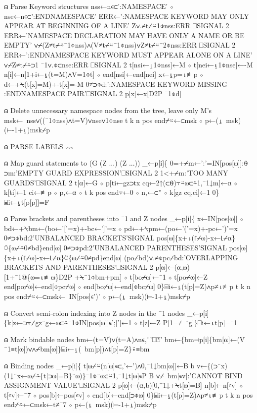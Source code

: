 \documentclass{article}%
\begin{document}
⍝ Parse Keyword structures
         nss←n∊⊂':NAMESPACE' ⋄ nse←n∊⊂':ENDNAMESPACE'
         ERR←':NAMESPACE KEYWORD MAY ONLY APPEAR AT BEGINNING OF A LINE'
         Z∨.≠t⌿⍨1⌽nss:ERR ⎕SIGNAL 2
         ERR←'NAMESPACE DECLARATION MAY HAVE ONLY A NAME OR BE EMPTY'
         ∨⌿(Z≠t⌿⍨¯1⌽nss)∧(V≠t⌿⍨¯1⌽nss)∨Z≠t⌿⍨¯2⌽nss:ERR ⎕SIGNAL 2
         ERR←':ENDNAMESPACE KEYWORD MUST APPEAR ALONE ON A LINE'
         ∨⌿Z≠t⌿⍨⊃1 ¯1∨.⌽⊂nse:ERR ⎕SIGNAL 2
         t[nsi←⍸1⌽nss]←M ⋄ t[nei←⍸1⌽nse]←-M
         n[i]←n[1+i←⍸(t=M)∧V=1⌽t] ⋄ end[nsi]←end[nei]
         x←⍸p=⍳≢p ⋄ d←+⍀(t[x]=M)+-t[x]=-M
         0≠⊃⌽d:':NAMESPACE KEYWORD MISSING :ENDNAMESPACE PAIR'⎕SIGNAL 2
         p[x]←x[D2P ¯1⌽d]

⍝ Delete unnecessary namespace nodes from the tree, leave only M's
         msk←~nss∨((¯1⌽nss)∧t=V)∨nse∨1⌽nse
         t k n pos end⌿⍨←⊂msk ⋄ p←(⍸~msk)(⊢-1+⍸)msk⌿p

⍝ PARSE LABELS ∘∘∘

⍝ Map guard statements to (G (Z ...) (Z ...))
         _←p[i]\{
                 0=+⌿m←':'=IN[pos[⍵]]:⍬
                 ⊃m:'EMPTY GUARD  EXPRESSION'⎕SIGNAL 2
                 1<+⌿m:'TOO MANY GUARDS'⎕SIGNAL 2
                 t[⍺]←G ⋄ p[ti←gz⊃tx cq←2↑(⊂⍬)⍪⍨⍵⊂⍨1,¯1↓m]←⍺ ⋄ k[ti]←1
                 ci←≢p ⋄ p,←⍺ ⋄ t k pos end⍪←0 ⋄ n,←⊂'' ⋄ k[gz cq,ci]←1
         0\}⌸i←⍸t[p[p]]=F

⍝ Parse brackets and parentheses into ¯1 and Z nodes
         _←p[i]\{
                 x←IN[pos[⍵]] ⋄ bd←+⍀bm←(bo←'['=x)+-bc←']'=x ⋄ pd←+⍀pm←(po←'('=x)+-pc←')'=x
                 0≠⊃⌽bd:2'UNBALANCED BRACKETS'SIGNAL pos[⍵]\{x+⍳(⌈⌿⍵)-x←⌊⌿⍺\}⍥\{⍵⌿⍨0≠bd\}end[⍵]
                 0≠⊃⌽pd:2'UNBALANCED PARENTHESES'SIGNAL pos[⍵]\{x+⍳(⌈⌿⍵)-x←⌊⌿⍺\}⍥\{⍵⌿⍨0≠pd\}end[⍵]
                 (po⌿bd)∨.≠⌽pc⌿bd:'OVERLAPPING BRACKETS AND PARENTHESES'⎕SIGNAL 2
                 p[⍵]←(⍺,⍵)[1+¯1@\{⍵=⍳≢⍵\}D2P +⍀¯1⌽bm+pm] ⋄ t[bo⌿⍵]←¯1 ⋄ t[po⌿⍵]←Z
                 end[po⌿⍵]←end[⌽pc⌿⍵] ⋄ end[bo⌿⍵]←end[⌽bc⌿⍵]
         0\}⌸i←⍸(t[p]=Z)∧p≠⍳≢p
         t k n pos end⌿⍨←⊂msk←~IN[pos]∊')' ⋄ p←(⍸~msk)(⊢-1+⍸)msk⌿p

⍝ Convert semi-colon indexing into Z nodes in the ¯1 nodes
         _←p[i]\{k[z←⊃⍪⌿gz¨g←⍵⊂⍨¯1⌽IN[pos[⍵]]∊';]']←1 ⋄ t[z]←Z P[1=≢¨g]\}⌸i←⍸t[p]=¯1

⍝ Mark bindable nodes
         bm←(t=V)∨(t=A)∧n∊,¨'⎕⍞'
         bm←\{bm⊣p[i]\{bm[⍺]←(V ¯1≡t[⍵])∨∧⌿bm[⍵]\}⌸i←⍸(~bm[p])∧t[p]=Z\}⍣≡bm

⍝ Binding nodes
         _←p[i]\{
                 t[⍵⌿⍨(n[⍵]∊⊂,'←')∧0,¯1↓bm[⍵]]←B
                 b v←\{(⊃¨x)(1↓¨x←⍵⌿⍨\{t[⊃⍵]=B\}¨⍵)\}¯1⌽¨⍵⊂⍨1,¯1↓t[⍵]∊P B
                 ∨⌿~bm[∊v]:'CANNOT BIND ASSIGNMENT VALUE'⎕SIGNAL 2
                 p[⍵]←(⍺,b)[0,¯1↓+⍀t[⍵]=B]
                 n[b]←n[∊v] ⋄ t[∊v]←¯7 ⋄ pos[b]←pos[∊v] ⋄ end[b]←end[⊃⌽⍵]
         0\}⌸i←⍸(t[p]=Z)∧p≠⍳≢p
         t k n pos end⌿⍨←⊂msk←t≠¯7 ⋄ p←(⍸~msk)(⊢-1+⍸)msk⌿p
\end{document}
